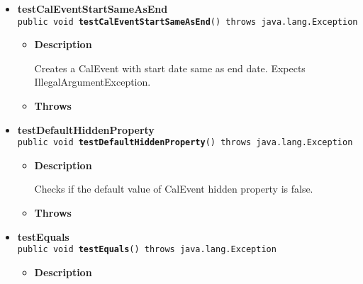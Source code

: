 \documentclass[11pt,a4paper]{report}
\begin{document}
{{{\begin{itemize}
{\begin{itemize}
{Creates a CalEvent with end date before start date. Expects IllegalArgumentException.
}
\item{{\bf  Throws}
}%
\end{itemize}
}%
\item{ 
{\bf  testCalEventStartSameAsEnd}\\
\texttt{public void\ {\bf  testCalEventStartSameAsEnd}() throws java.lang.Exception
\label{is.mpg.ruglan.test.CalEventTest.testCalEventStartSameAsEnd()}}%
\begin{itemize}
\item{
{\bf  Description}

Creates a CalEvent with start date same as end date. Expects IllegalArgumentException.
}
\item{{\bf  Throws}
}%
\end{itemize}
}%
\item{ 
{\bf  testDefaultHiddenProperty}\\
\texttt{public void\ {\bf  testDefaultHiddenProperty}() throws java.lang.Exception
\label{is.mpg.ruglan.test.CalEventTest.testDefaultHiddenProperty()}}%
\begin{itemize}
\item{
{\bf  Description}

Checks if the default value of CalEvent hidden property is false.
}
\item{{\bf  Throws}
}%
\end{itemize}
}%
\item{ 
{\bf  testEquals}\\
\texttt{public void\ {\bf  testEquals}() throws java.lang.Exception
\label{is.mpg.ruglan.test.CalEventTest.testEquals()}}%
\begin{itemize}
\item{
{\bf  Description}

}
\end{itemize}}
\end{itemize}}}}
\end{document}
